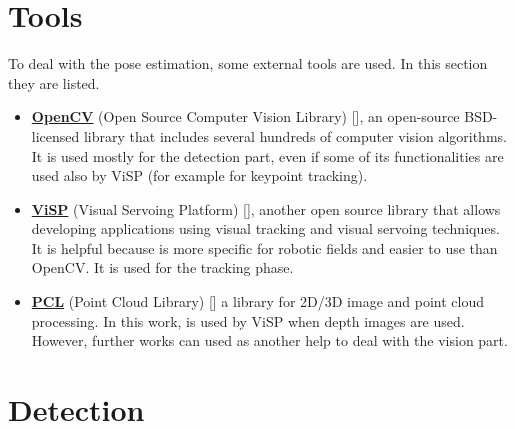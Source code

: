 \section{Tools}
\label{sec:visionTools}
To deal with the pose estimation, some external tools are used. In this section they are listed.

\begin{itemize}


	\item \href{https://opencv.org/}{\textbf{OpenCV}} (Open Source Computer Vision Library) [\cite{opencv}],  an open-source BSD-licensed library that includes several hundreds of computer vision algorithms. It is used mostly for the detection part, even if some of its functionalities are used also by ViSP (for example for keypoint tracking).
	
	\item \href{https://visp.inria.fr/}{\textbf{ViSP}} (Visual Servoing Platform) [\cite{visp}], another open source library that allows developing applications using visual tracking and visual servoing techniques. It is helpful because is more specific for robotic fields and easier to use than OpenCV. It is used for the tracking phase.
	
	\item \href{http://www.pointclouds.org/}{\textbf{PCL}} (Point Cloud Library) [\cite{pclLib}] a library for 2D/3D image and point cloud processing. In this work, is used by ViSP when depth images are used. However, further works can used as another help to deal with the vision part.
	
\end{itemize}

\section{Detection}
\label{sec:visDetect}

